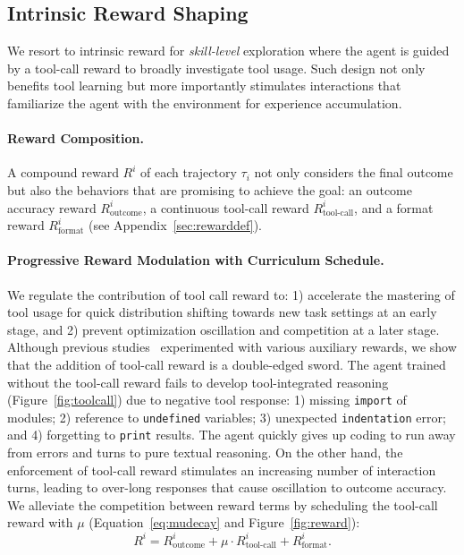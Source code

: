 \documentclass[]{youtu} %
\begin{document}
\subsection{Intrinsic Reward Shaping}

{
We resort to intrinsic reward for \textit{skill-level} exploration where the agent is guided by a tool-call reward to broadly investigate tool usage.
Such design not only benefits tool learning but more importantly stimulates interactions that familiarize the agent with the environment for experience accumulation.
}

\paragraph{Reward Composition.}
\label{sec:rewardcomposition}
A compound reward $R^{i}$ of each trajectory $\tau_i$ not only considers the 
final outcome but also the 
behaviors that are promising to achieve the goal:
an 
outcome accuracy reward $R^i_{\text{outcome}}$, a 
continuous tool-call reward $R^i_{\text{tool-call}}$, and a
format reward $R^i_{\text{format}}$ (see Appendix~\ref{sec:rewarddef}).










\paragraph{Progressive Reward Modulation with Curriculum Schedule.}
\label{sec:curriculumoutcomereward}

{
We regulate the contribution of tool call reward to:
1) accelerate the mastering of tool usage for quick distribution shifting towards new task settings at an early stage, and 2) prevent optimization oscillation and competition at a later stage.}
Although previous studies~\cite{qian2025toolrl,li2023tool,da2025agent,xia2025agentrm,singh2025agentic,wei2025autotir,gou2023tora,lin2025understanding} experimented with various auxiliary rewards,
we show that the addition of tool-call reward is a double-edged sword.
The agent trained without the tool-call reward fails to develop tool-integrated reasoning (Figure~\ref{fig:toolcall}) due to negative tool response:
1) missing \texttt{import} of modules;
2) reference to \texttt{undefined} variables;
3) unexpected \texttt{indentation} error;
and 4) forgetting to \texttt{print} results.
The agent quickly gives up coding to run away from errors and turns to pure textual reasoning.
On the other hand,
the enforcement of tool-call reward stimulates an increasing number of interaction turns,
leading to over-long responses that cause oscillation to outcome accuracy.
We alleviate the competition between reward terms by scheduling the tool-call reward with $\mu$ (Equation~\ref{eq:mudecay} and Figure~\ref{fig:reward}):
\begin{equation}\label{eq:rewardtotal}
    R^{i}=R^i_{\text{outcome}}+\mu\cdot R^i_{\text{tool-call}}+R^i_{\text{format}}.
\end{equation}
\end{document}
